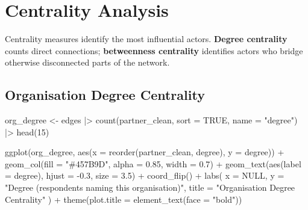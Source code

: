 \documentclass[
  letterpaper,
  DIV=11,
  numbers=noendperiod]{scrartcl}
\newenvironment{Shaded}{\begin{snugshade}}{\end{snugshade}}
\newcommand{\AttributeTok}[1]{\textcolor[rgb]{0.40,0.45,0.13}{#1}}
\newcommand{\ConstantTok}[1]{\textcolor[rgb]{0.56,0.35,0.01}{#1}}
\newcommand{\DecValTok}[1]{\textcolor[rgb]{0.68,0.00,0.00}{#1}}
\newcommand{\FloatTok}[1]{\textcolor[rgb]{0.68,0.00,0.00}{#1}}
\newcommand{\FunctionTok}[1]{\textcolor[rgb]{0.28,0.35,0.67}{#1}}
\newcommand{\NormalTok}[1]{\textcolor[rgb]{0.00,0.23,0.31}{#1}}
\newcommand{\OtherTok}[1]{\textcolor[rgb]{0.00,0.23,0.31}{#1}}
\newcommand{\SpecialCharTok}[1]{\textcolor[rgb]{0.37,0.37,0.37}{#1}}
\newcommand{\StringTok}[1]{\textcolor[rgb]{0.13,0.47,0.30}{#1}}
\begin{document}
\section{Centrality Analysis}\label{centrality-analysis}

Centrality measures identify the most influential actors. \textbf{Degree
centrality} counts direct connections; \textbf{betweenness centrality}
identifies actors who bridge otherwise disconnected parts of the
network.

\subsection{Organisation Degree
Centrality}\label{organisation-degree-centrality}

\begin{Shaded}
\begin{Highlighting}[]
\NormalTok{org\_degree }\OtherTok{\textless{}{-}}\NormalTok{ edges }\SpecialCharTok{|\textgreater{}}
  \FunctionTok{count}\NormalTok{(partner\_clean, }\AttributeTok{sort =} \ConstantTok{TRUE}\NormalTok{, }\AttributeTok{name =} \StringTok{"degree"}\NormalTok{) }\SpecialCharTok{|\textgreater{}}
  \FunctionTok{head}\NormalTok{(}\DecValTok{15}\NormalTok{)}

\FunctionTok{ggplot}\NormalTok{(org\_degree, }\FunctionTok{aes}\NormalTok{(}\AttributeTok{x =} \FunctionTok{reorder}\NormalTok{(partner\_clean, degree), }\AttributeTok{y =}\NormalTok{ degree)) }\SpecialCharTok{+}
  \FunctionTok{geom\_col}\NormalTok{(}\AttributeTok{fill =} \StringTok{"\#457B9D"}\NormalTok{, }\AttributeTok{alpha =} \FloatTok{0.85}\NormalTok{, }\AttributeTok{width =} \FloatTok{0.7}\NormalTok{) }\SpecialCharTok{+}
  \FunctionTok{geom\_text}\NormalTok{(}\FunctionTok{aes}\NormalTok{(}\AttributeTok{label =}\NormalTok{ degree), }\AttributeTok{hjust =} \SpecialCharTok{{-}}\FloatTok{0.3}\NormalTok{, }\AttributeTok{size =} \FloatTok{3.5}\NormalTok{) }\SpecialCharTok{+}
  \FunctionTok{coord\_flip}\NormalTok{() }\SpecialCharTok{+}
  \FunctionTok{labs}\NormalTok{(}
    \AttributeTok{x =} \ConstantTok{NULL}\NormalTok{,}
    \AttributeTok{y =} \StringTok{"Degree (respondents naming this organisation)"}\NormalTok{,}
    \AttributeTok{title =} \StringTok{"Organisation Degree Centrality"}
\NormalTok{  ) }\SpecialCharTok{+}
  \FunctionTok{theme}\NormalTok{(}\AttributeTok{plot.title =} \FunctionTok{element\_text}\NormalTok{(}\AttributeTok{face =} \StringTok{"bold"}\NormalTok{))}
\end{Highlighting}
\end{Shaded}
\end{document}
